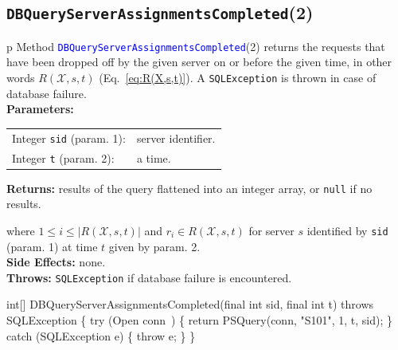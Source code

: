 \subsection{\texttt{DBQueryServerAssignmentsCompleted}(2)}
\begin{tabular}{p{\textwidth}}
\toprule
{}
Method \textcolor{blue}{{\tt{}\protect{}DBQueryServerAssignmentsCompleted}}(2) returns the
requests that have been dropped off by the given server on or before the given time,
in other words $R(\mathcal{X},s,t)$ (Eq.~\ref{eq:R(X,s,t)}).
A {\tt{}SQLException} is thrown in case of database failure.\\
\midrule
\textbf{Parameters:} \\
\begin{tabular}{lp{116mm}}
Integer {\tt{}sid} (param. 1):&server identifier.\\
Integer {\tt{}t} (param. 2):&a time.\\
\end{tabular}
\textbf{Returns:} results of the query flattened into an integer array,
or {\tt{}null} if no results.


where $1\leq i\leq |R(\mathcal{X},s,t)|$ and
$r_i\in R(\mathcal{X},s,t)$ for server $s$ identified by {\tt{}sid} (param. 1)
at time $t$ given by param. 2.\\
\textbf{Side Effects:} none.\\
\textbf{Throws:} {\tt{}SQLException} if database failure is encountered.\\
\bottomrule
\end{tabular}
\nwenddocs{}\endmoddef{}
int[] DBQueryServerAssignmentsCompleted(final int sid, final int t)
throws SQLException \{
  try (\LA{}Open \code{}conn\edoc{}~{\nwtagstyle{}}\RA{}) \{
    return PSQuery(conn, "S101", 1, t, sid);
  \} catch (SQLException e) \{
    throw e;
  \}
\}
\eatline
{}\nwendcode{}\nwdocspar
